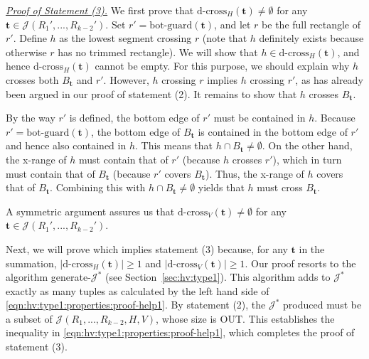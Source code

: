 \documentclass[sigconf]{acmart}
\def\vgap{\vspace{0mm}}
\def\J{\mathcal{J}}
\def\gbot{\mathrm{bot\text{-}guard}}
\def\dcross{\mathrm{d\text{-}cross}}
\def\out{\mathrm{OUT}}
\begin{document}
{{{\vgap 

\noindent \underline{\em Proof of Statement (3).} We first prove that $\dcross_H(\bm{t}) \neq \emptyset$ for any $\bm{t} \in \J(R_1',...,R_{k-2}')$. Set $r' = \gbot(\bm{t})$, and let $r$ be the full rectangle of $r'$. Define $h$ as the lowest segment crossing $r$ (note that $h$ definitely exists because otherwise $r$ has no trimmed rectangle). We will show that $h \in \dcross_H(\bm{t})$, and hence $\dcross_H(\bm{t})$ cannot be empty. For this purpose, we should explain why $h$ crosses both $B_{\bm{t}}$ and $r'$. However, $h$ crossing $r$ implies $h$ crossing $r'$, as has already been argued in our proof of statement (2). It remains to show that $h$ crosses $B_\bm{t}$.

\vgap

By the way $r'$ is defined, the bottom edge of $r'$ must be contained in $h$. Because $r' = \gbot(\bm{t})$, the bottom edge of $B_\bm{t}$ is contained in the bottom edge of $r'$ and hence also contained in $h$. This means that $h \cap B_{\bm{t}}\neq \emptyset$. On the other hand, the x-range of $h$ must contain that of $r'$ (because $h$ crosses $r'$), which in turn must contain that of $B_\bm{t}$ (because $r'$ covers $B_\bm{t}$). Thus, the x-range of $h$ covers that of $B_\bm{t}$. Combining this with $h \cap B_{\bm{t}}\neq \emptyset$ yields that $h$ must cross $B_\bm{t}$.

\vgap 

A symmetric argument assures us that $\dcross_V(\bm{t}) \ne \emptyset$ for any $\bm{t} \in \J(R_1',...,R_{k-2}')$. 


\vgap 

Next, we will prove 
\myeqn{
    \sum_{\bm{t}\in \J(R_1',...,R_{k-2}')} |\dcross_H(\bm{t})| \cdot |\dcross_V(\bm{t})| \leq \out. \label{eqn:hv:type1:properties:proof-help1}
} 
which implies statement (3) because, for any $\bm{t}$ in the summation, $|\dcross_H(\bm{t})| \ge 1$ and $|\dcross_V(\bm{t})| \ge 1$. Our proof resorts to the algorithm generate-$\J^*$ (see Section~\ref{sec:hv:type1}). This algorithm adds to $\J^*$ exactly as many tuples as calculated by the left hand side of \eqref{eqn:hv:type1:properties:proof-help1}. By statement (2), the $\J^*$ produced must be a subset of $\J(R_1,...,R_{k-2},H,V)$, whose size is $\out$. This establishes the inequality in \eqref{eqn:hv:type1:properties:proof-help1}, which completes the proof of statement (3).

}}}
\end{document}
